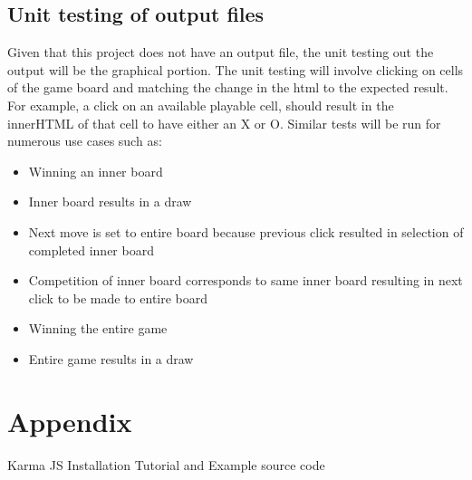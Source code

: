 \documentclass[12pt, titlepage]{article}
\begin{document}
\subsection{Unit testing of output files}		
Given that this project does not have an output file, the unit testing out the
output will be the graphical portion. The unit testing will involve clicking
on cells of the game board and matching the change in the html to the expected
result. For example, a click on an available playable cell, should result in
the innerHTML of that cell to have either an X or O. Similar tests will be run
for numerous use cases such as:
\begin{itemize}
\item
Winning an inner board
\item
Inner board results in a draw
\item
Next move is set to entire board because previous click resulted in selection
of completed inner board
\item
Competition of inner board corresponds to same inner board resulting in next
click to be made to entire board
\item
Winning the entire game
\item
Entire game results in a draw
\end{itemize}




\newpage

\section{Appendix}

Karma JS Installation Tutorial and Example source code~\citep{Karma}
\end{document}
